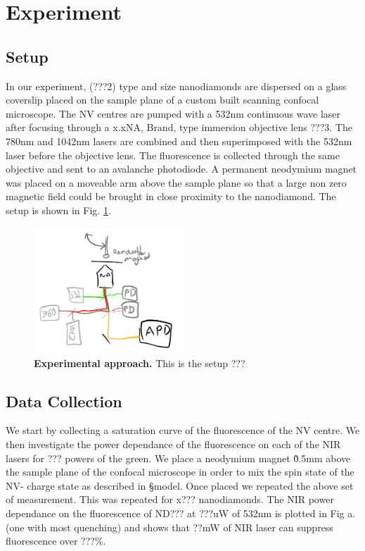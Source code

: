 \documentclass[prl]{revtex4}
\begin{document}
\section{Experiment}
\subsection{Setup}
In our experiment, (???2) type and size nanodiamonds are dispersed on a glass coverslip placed on the sample plane of a custom built scanning confocal microscope. The NV centres are pumped with a 532nm continuous wave laser after focusing through a x.xNA, Brand, type immersion objective lens ???3. The 780nm and 1042nm lasers are combined and then superimposed with the 532nm laser before the objective lens. The fluorescence is collected through the same objective and sent to an avalanche photodiode. A permanent neodymium magnet was placed on a moveable arm above the sample plane so that a large non zero magnetic field could be brought in close proximity to the nanodiamond. The setup is shown in Fig. \ref{FigSetup}.

\begin{figure}[t]
  \centering
  \includegraphics[width=0.5\textwidth]{Setup.png} 
 \caption{\textbf{Experimental approach.} This is the setup ???} \label{FigSetup}
\end{figure}

\subsection{Data Collection}
We start by collecting a saturation curve of the fluorescence of the NV centre. We then investigate the power dependance of the fluorescence on each of the NIR lasers for ??? powers of the green. We place a neodymium magnet \~0.5mm above the sample plane of the confocal microscope in order to mix the spin state of the NV- charge state as described in \S model. Once placed we repeated the above set of measurement. This was repeated for x??? nanodiamonds. The NIR power dependance on the fluorescence of ND??? at ???uW of 532nm is plotted in Fig a. (one with most quenching) and shows that ??mW of NIR laser can suppress fluorescence over ???\%.
\end{document}

